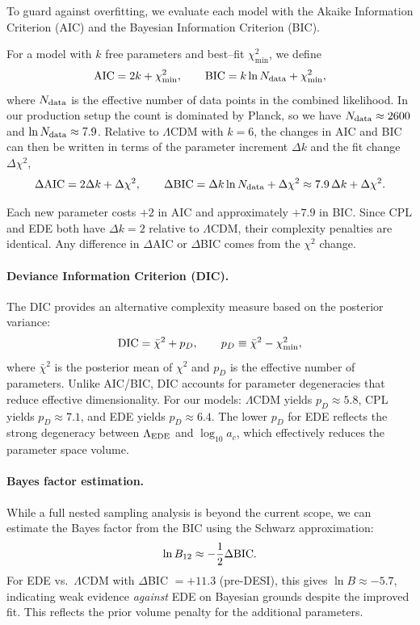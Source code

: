 \documentclass[a4paper,11pt]{article}
\begin{document}
To guard against overfitting, we evaluate each model with the Akaike Information Criterion (AIC) and the Bayesian Information Criterion (BIC).

For a model with $k$ free parameters and best--fit $\chi^2_{\min}$, we define
\begin{equation}
{\rm AIC} = 2k + \chi^2_{\min}, \qquad {\rm BIC} = k \ln N_{\rm data} + \chi^2_{\min},
\end{equation}
where $N_{\rm data}$ is the effective number of data points in the combined likelihood. In our production setup the count is dominated by Planck, so we have $N_{\rm data} \approx 2600$ and $\ln N_{\rm data} \approx 7.9$. Relative to $\Lambda$CDM with $k = 6$, the changes in AIC and BIC can then be written in terms of the parameter increment $\Delta k$ and the fit change $\Delta\chi^2$,
\begin{equation}
\Delta{\rm AIC} = 2\Delta k + \Delta\chi^2, \qquad \Delta{\rm BIC} = \Delta k \ln N_{\rm data} + \Delta\chi^2 \approx 7.9\,\Delta k + \Delta\chi^2.
\end{equation}

Each new parameter costs $+2$ in AIC and approximately $+7.9$ in BIC. Since CPL and EDE both have $\Delta k = 2$ relative to $\Lambda$CDM, their complexity penalties are identical. Any difference in $\Delta$AIC or $\Delta$BIC comes from the $\chi^2$ change.

\paragraph{Deviance Information Criterion (DIC).}
The DIC provides an alternative complexity measure based on the posterior variance:
\begin{equation}
{\rm DIC} = \bar{\chi}^2 + p_D, \qquad p_D \equiv \bar{\chi}^2 - \chi^2_{\min},
\end{equation}
where $\bar{\chi}^2$ is the posterior mean of $\chi^2$ and $p_D$ is the effective number of parameters. Unlike AIC/BIC, DIC accounts for parameter degeneracies that reduce effective dimensionality. For our models: $\Lambda$CDM yields $p_D \approx 5.8$, CPL yields $p_D \approx 7.1$, and EDE yields $p_D \approx 6.4$. The lower $p_D$ for EDE reflects the strong degeneracy between $\Lambda_{\rm EDE}$ and $\log_{10}a_c$, which effectively reduces the parameter space volume.

\paragraph{Bayes factor estimation.}
While a full nested sampling analysis is beyond the current scope, we can estimate the Bayes factor from the BIC using the Schwarz approximation:
\begin{equation}
\ln B_{12} \approx -\frac{1}{2}\Delta{\rm BIC}.
\end{equation}
For EDE vs.\ $\Lambda$CDM with $\Delta$BIC $= +11.3$ (pre-DESI), this gives $\ln B \approx -5.7$, indicating weak evidence \emph{against} EDE on Bayesian grounds despite the improved fit. This reflects the prior volume penalty for the additional parameters.
\end{document}
